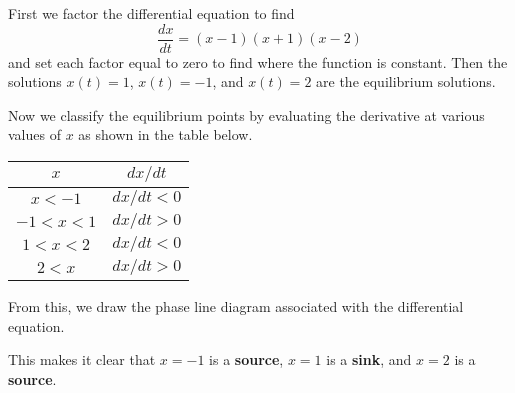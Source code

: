 \documentclass[11pt]{article}
\newcommand*{\TickSize}{2pt}%
\newcommand*{\AxisMin}{0}%
\newcommand*{\AxisMax}{0}%
\newcommand*{\DrawHorizontalPhaseLine}[4][]{%
    \gdef\AxisMin{0}%
    \gdef\AxisMax{0}%
    \edef\MyList{#2}%
    \foreach \X in \MyList {
        \draw  (\X,\TickSize) -- (\X,-\TickSize) node [below] {$\X$};
        \ifnum\AxisMin>\X
            \xdef\AxisMin{\X}%
        \fi
        \ifnum\AxisMax<\X
            \xdef\AxisMax{\X}%
        \fi
    }

    \edef\MyList{#3}%
    \foreach \X in \MyList {%
        \draw [->] (\X-0.1,0) -- (\X,0);
        \ifnum\AxisMin>\X
            \xdef\AxisMin{\X}%
        \fi
        \ifnum\AxisMax<\X
            \xdef\AxisMax{\X}%
        \fi
    }

    \edef\MyList{#4}%
    \foreach \X in \MyList {%
        \draw [<-] (\X-0.1,0) -- (\X,0);
        \ifnum\AxisMin>\X
            \xdef\AxisMin{\X}%
        \fi
        \ifnum\AxisMax<\X
            \xdef\AxisMax{\X}%
        \fi
    }

    \draw  (\AxisMin-1,0) -- (\AxisMax+1,0) node [right] {#1};
}
\begin{document}
  \begin{solution}
    First we factor the differential equation to find
    \begin{equation*}
      \frac{dx}{dt} = (x - 1) (x + 1) (x - 2)
    \end{equation*}
    and set each factor equal to zero to find where the function is constant.
    Then the solutions \(x(t) = 1\), \(x(t) = -1\), and \(x(t) = 2\) are the equilibrium solutions.

    Now we classify the equilibrium points by evaluating the derivative at various values of \(x\) as shown in the table below.
    \begin{center}
      \begin{tabular}{ |c|c| }
        \hline
        \(x\) & \(dx/dt\) \\
        \hline
        \(x < -1\) & \(dx/dt < 0\) \\
        \hline
        \(-1 < x < 1\) & \(dx/dt > 0\) \\
        \hline
        \(1 < x < 2\) & \(dx/dt < 0\) \\
        \hline
        \(2 < x\) & \(dx/dt > 0\) \\
        \hline
      \end{tabular}
    \end{center}

    From this, we draw the phase line diagram associated with the differential equation.

    \begin{figure}[h]
      \centering
    \end{figure}

    This makes it clear that \(x = -1\) is a \textbf{source}, \(x = 1\) is a \textbf{sink}, and \(x = 2\) is a \textbf{source}.
  \end{solution}
\end{document}
